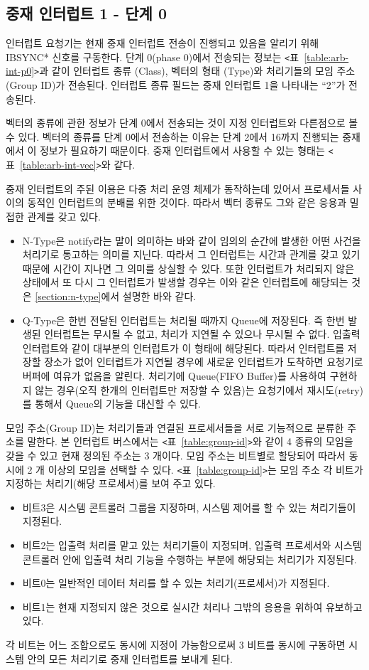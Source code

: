 \subsection*{중재 인터럽트 1 - 단계 0}
인터럽트 요청기는 현재 중재 인터럽트 전송이 진행되고 있음을 알리기 위해 IBSYNC* 신호를 구동한다.
단계 0(phase 0)에서 전송되는 정보는
{\tt <}표~\ref{table:arb-int-p0}{\tt >}과 같이 인터럽트 종류 (Class), 
벡터의 형태 (Type)와 처리기들의 모임 주소 (Group ID)가 전송된다. 
인터럽트 종류 필드는 중재 인터럽트 1을 나타내는 ``2''가 전송된다.

벡터의 종류에 관한 정보가 단계 0에서 전송되는 것이 지정 인터럽트와 다른점으로 볼 수 있다.
벡터의 종류를 단계 0에서 전송하는 이유는 단계 2에서 16까지 진행되는 중재에서
이 정보가 필요하기 때문이다.
중재 인터럽트에서 사용할 수 있는 형태는 {\tt <}표~\ref{table:arb-int-vec}{\tt >}와 같다.

중재 인터럽트의 주된 이용은 다중 처리 운영 체제가 동작하는데 있어서 프로세서들 사이의
동적인 인터럽트의 분배를 위한 것이다. 따라서 벡터 종류도 그와 같은 응용과 밀접한
관계를 갖고 있다. 
\begin{itemize}
	\item N-Type은 notify라는 말이 의미하는 바와 같이 임의의 순간에 발생한 어떤 사건을
	처리기로 통고하는 의미를 지닌다. 따라서 그 인터럽트는 시간과 관계를 갖고 있기 때문에
	시간이 지나면 그 의미를 상실할 수 있다.
	또한 인터럽트가 처리되지 않은 상태에서 또 다시 그 인터럽트가 발생할 경우는
	이와 같은 인터럽트에 해당되는 것은 \ref{section:n-type}에서 설명한 바와 같다.
	\item Q-Type은 한번 전달된 인터럽트는 처리될 때까지 Queue에 저장된다.
	즉 한번 발생된 인터럽트는 무시될 수 없고, 처리가 지연될 수 있으나 무시될 수 없다.
	입출력 인터럽트와 같이 대부분의 인터럽트가 이 형태에 해당된다.
	따라서 인터럽트를 저장할 장소가 없어 인터럽트가 지연될 경우에 새로운 인터럽트가 도착하면
	요청기로 버퍼에 여유가 없음을 알린다.
	처리기에 Queue(FIFO Buffer)를 사용하여 구현하지 않는 경우(오직 한개의 인터럽트만
	저장할 수 있음)는 요청기에서 재시도(retry)를 통해서 Queue의 기능을 대신할 수 있다.
\end{itemize}
%
모임 주소(Group ID)는 처리기들과 연결된 프로세서들을 서로 기능적으로
분류한 주소를 말한다. 본 인터럽트 버스에서는 {\tt <}표~\ref{table:group-id}{\tt >}와 같이
4 종류의 모임을 갖을 수 있고 현재 정의된 주소는 3 개이다.
모임 주소는 비트별로 할당되어 따라서 동시에 2 개 이상의 모임을 선택할 수 있다.
{\tt <}표~\ref{table:group-id}{\tt >}는
모임 주소 각 비트가 지정하는 처리기(해당 프로세서)를 보여 주고 있다.

\begin{itemize}
	\item 비트3은 시스템 콘트롤러 그룹을 지정하며, 시스템 제어를 할 수 있는 처리기들이 지정된다.
	\item 비트2는 입출력 처리를 맡고 있는 처리기들이 지정되며, 입출력 프로세서와 시스템 콘트롤러 안에
	입출력 처리 기능을 수행하는 부분에 해당되는 처리기가 지정된다.
	\item 비트0는 일반적인 데이터 처리를 할 수 있는 처리기(프로세서)가 지정된다.
	\item 비트1는 현재 지정되지 않은 것으로 실시간 처리나 그밖의 응용을 위하여 유보하고 있다.
\end{itemize}
각 비트는 어느 조합으로도 동시에 지정이 가능함으로써 3 비트를 동시에 구동하면
시스템 안의 모든 처리기로 중재 인터럽트를 보내게 된다.
%
